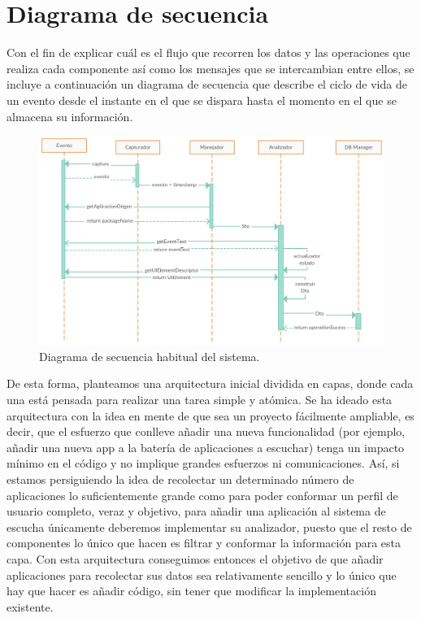 \documentclass[12pt,a4paper,oneside]{book} %
\begin{document}
\section{Diagrama de secuencia}
Con el fin de explicar cuál es el flujo que recorren los datos y las operaciones que realiza cada componente así como los mensajes que se intercambian entre ellos, se incluye a continuación un diagrama de secuencia que describe el ciclo de vida de un evento desde el instante en el que se dispara hasta el momento en el que se almacena su información. 
\begin{figure}[H]
  \begin{center}
     \includegraphics[scale=0.22]{pictures/secuencediagrams/diagrama_seq_flujo.png}
  \end{center}
  \caption[Diagrama de secuencia]{Diagrama de secuencia habitual del sistema.}
    \label{fig:LandscapeFigure}
\end{figure}
De esta forma, planteamos una arquitectura inicial dividida en capas, donde cada una está pensada para realizar una tarea simple y atómica. 
\newline \newline 
Se ha ideado esta arquitectura con la idea en mente de que sea un proyecto fácilmente ampliable, es decir, que el esfuerzo que conlleve añadir una nueva funcionalidad (por ejemplo, añadir una nueva app a la batería de aplicaciones a escuchar) tenga un impacto mínimo en el código y no implique grandes esfuerzos ni comunicaciones. 
\newline \newline 
Así, si estamos persiguiendo la idea de recolectar un determinado número de aplicaciones lo suficientemente grande como para poder conformar un perfil de usuario completo, veraz y objetivo, para añadir una aplicación al sistema de escucha únicamente deberemos implementar su analizador, puesto que el resto de componentes lo único que hacen es filtrar y conformar la información para esta capa. 
\newline \newline 
Con esta arquitectura conseguimos entonces el objetivo de que añadir aplicaciones para recolectar sus datos sea relativamente sencillo y lo único que hay que hacer es añadir código, sin tener que modificar la implementación existente. 
\end{document}
